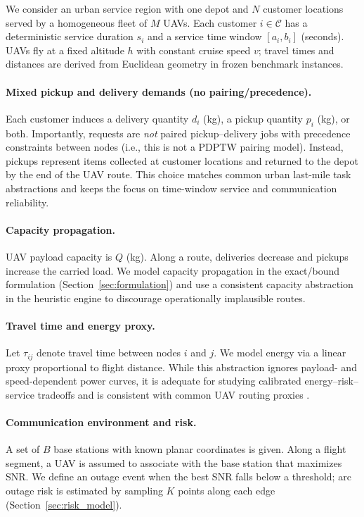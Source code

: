 \label{sec:problem}

We consider an urban service region with one depot and $N$ customer locations served by a homogeneous fleet of $M$ UAVs. Each customer $i\in\mathcal{C}$ has a deterministic service duration $s_i$ and a service time window $[a_i,b_i]$ (seconds). UAVs fly at a fixed altitude $h$ with constant cruise speed $v$; travel times and distances are derived from Euclidean geometry in frozen benchmark instances.

\paragraph{Mixed pickup and delivery demands (no pairing/precedence).}
Each customer induces a delivery quantity $d_i$ (kg), a pickup quantity $p_i$ (kg), or both. Importantly, requests are \emph{not} paired pickup--delivery jobs with precedence constraints between nodes (i.e., this is not a PDPTW pairing model). Instead, pickups represent items collected at customer locations and returned to the depot by the end of the UAV route. This choice matches common urban last-mile task abstractions and keeps the focus on time-window service and communication reliability.

\paragraph{Capacity propagation.}
UAV payload capacity is $Q$ (kg). Along a route, deliveries decrease and pickups increase the carried load. We model capacity propagation in the exact/bound formulation (Section~\ref{sec:formulation}) and use a consistent capacity abstraction in the heuristic engine to discourage operationally implausible routes.

\paragraph{Travel time and energy proxy.}
Let $\tau_{ij}$ denote travel time between nodes $i$ and $j$. We model energy via a linear proxy proportional to flight distance. While this abstraction ignores payload- and speed-dependent power curves, it is adequate for studying calibrated energy--risk--service tradeoffs and is consistent with common UAV routing proxies \citep{dorling2017}.

\paragraph{Communication environment and risk.}
A set of $B$ base stations with known planar coordinates is given. Along a flight segment, a UAV is assumed to associate with the base station that maximizes SNR. We define an outage event when the best SNR falls below a threshold; arc outage risk is estimated by sampling $K$ points along each edge (Section~\ref{sec:risk_model}).

